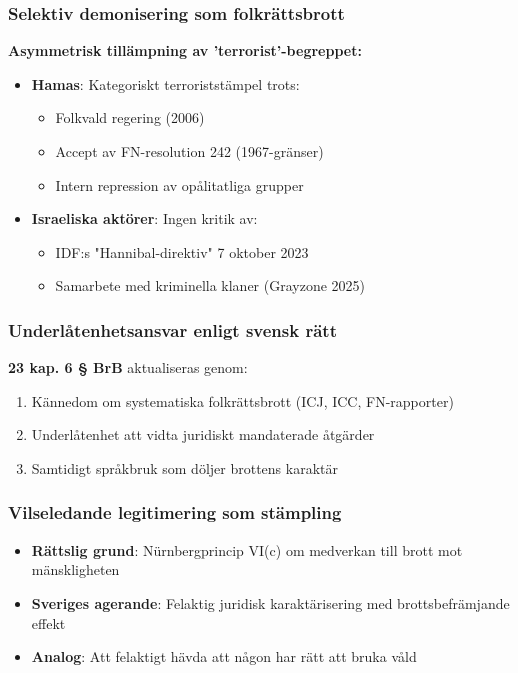 \subsubsection{Selektiv demonisering som folkrättsbrott}
\textbf{Asymmetrisk tillämpning av 'terrorist'-begreppet:}
\begin{itemize}
\item \textbf{Hamas}: Kategoriskt terroriststämpel trots:
  \begin{itemize}
  \item Folkvald regering (2006)
  \item Accept av FN-resolution 242 (1967-gränser)
  \item Intern repression av opålitatliga grupper
  \end{itemize}
\item \textbf{Israeliska aktörer}: Ingen kritik av:
  \begin{itemize}
  \item IDF:s "Hannibal-direktiv" 7 oktober 2023
  \item Samarbete med kriminella klaner (Grayzone 2025)
  \end{itemize}
\end{itemize}

\subsubsection{Underlåtenhetsansvar enligt svensk rätt}
\textbf{23 kap. 6 § BrB} aktualiseras genom:
\begin{enumerate}
\item Kännedom om systematiska folkrättsbrott (ICJ, ICC, FN-rapporter)
\item Underlåtenhet att vidta juridiskt mandaterade åtgärder
\item Samtidigt språkbruk som döljer brottens karaktär
\end{enumerate}

\subsubsection{Vilseledande legitimering som stämpling}
\begin{itemize}
\item \textbf{Rättslig grund}: Nürnbergprincip VI(c) om medverkan till brott mot mänskligheten
\item \textbf{Sveriges agerande}: Felaktig juridisk karaktärisering med brottsbefrämjande effekt
\item \textbf{Analog}: Att felaktigt hävda att någon har rätt att bruka våld
\end{itemize}

